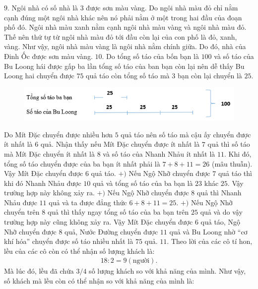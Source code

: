 \vskip 0.1cm
$9.$ Ngôi nhà có số nhà là $3$ được sơn màu vàng. Do ngôi nhà màu đỏ chỉ nằm cạnh đúng một ngôi nhà khác nên nó phải nằm ở một trong hai đầu của đoạn phố đó. Ngôi nhà màu xanh nằm cạnh ngôi nhà màu vàng và ngôi nhà màu đỏ. Thế nên thứ tự từ ngôi nhà màu đỏ tới đầu còn lại của con phố là đỏ, xanh, vàng. Như vậy, ngôi nhà màu vàng là ngôi nhà nằm chính giữa. Do đó, nhà của Đinh Ốc được sơn màu vàng.
\vskip 0.1cm
$10.$ Do tổng số táo của bốn bạn là $100$ và số táo của Bu Loong hái được gấp ba lần tổng số táo của ban bạn còn lại nên dễ thấy Bu Loong hai chuyển được $75$ quả táo còn tổng số táo mà $3$ bạn còn lại chuyển là $25$. 
\begin{figure}[H]
	\centering
	\vspace*{-5pt}
	\captionsetup{labelformat= empty, justification=centering}
	\includegraphics[width=1\linewidth]{9}
	\vspace*{-15pt}
\end{figure}
Do Mít Đặc chuyển được nhiều hơn $5$ quả táo nên số táo mà cậu ấy chuyển được ít nhất là $6$ quả.
\vskip 0.1cm
Nhận thấy nếu Mít Đặc chuyển được ít nhất là $7$ quả thì số táo mà Mít Đặc chuyển ít nhất là $8$ và số táo của Nhanh Nhảu ít nhất là $11$. Khi đó, tổng số táo chuyển được của ba bạn ít nhất phải là $7 + 8 + 11 = 26$ (mâu thuẫn).
\vskip 0.1cm
Vậy Mít Đặc chuyển được $6$ quả táo. 
\vskip 0.1cm
$+)$ Nếu Ngộ Nhỡ chuyển được $7$ quả táo thì khi đó Nhanh Nhảu được $10$ quả và tổng số táo của ba bạn là $23$ khác $25$. Vậy trường hợp này không xảy ra.
\vskip 0.1cm
$+)$ Nếu Ngộ Nhỡ chuyển được $8$ quả thì Nhanh Nhảu được $11$ quả và ta được đẳng thức $6+8+11= 25$.
\vskip 0.1cm
$+)$ Nếu Ngộ Nhỡ chuyển trên $8$ quả thì thấy ngay tổng số táo của ba bạn trên $25$ quả và do vậy trường hợp này cũng không xảy ra.
\vskip 0.1cm
Vậy Mít Đặc chuyển được $6$ quả táo, Ngộ Nhỡ chuyển được $8$ quả, Nước Đường chuyển được $11$ quả và Bu Loong nhờ “cơ khí hóa” chuyển được số táo nhiều nhất là $75$ quả.
\vskip 0.1cm
$11.$ 
Theo lời của các cô tí hon, lều của các cô còn có thể nhận số lượng khách là:
\begin{align*}
	18 : 2 = 9 (\text{người}).
\end{align*}
Mà lúc đó, lều đã chứa $3/4$ số lượng khách so với khả năng của mình.
Như vậy, số khách mà lều còn có thể nhận so với khả năng của mình là:
